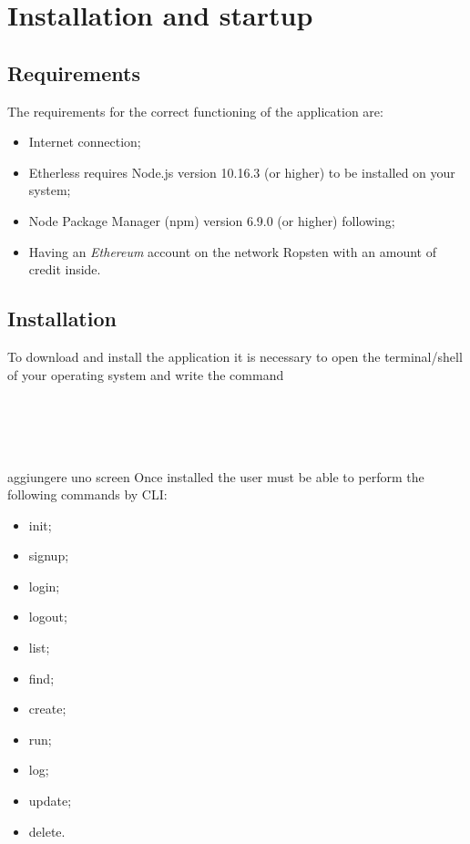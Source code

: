 \section{Installation and startup}
\subsection{Requirements}
The requirements for the correct functioning of the application are:
\begin{itemize}
	\item Internet connection;
	\item Etherless requires Node.js version 10.16.3 (or higher) to be installed on your system;
	\item Node Package Manager (npm) version 6.9.0 (or higher) following;
	\item Having an \textit{Ethereum\glo} account on the network Ropsten with an amount of credit inside.
\end{itemize}
\subsection{Installation}
To download and install the application it is necessary to open the terminal/shell of your operating system and write the command \\
\\
\centerline{}\\
\\
\\
aggiungere uno screen
Once installed the user must be able to perform the following commands by CLI: 
\begin{itemize}
	\item init;
	\item signup;
	\item login;
	\item logout;
	\item list;
	\item find;
	\item create;
	\item run;
	\item log;
	\item update;
	\item delete.

\end{itemize}